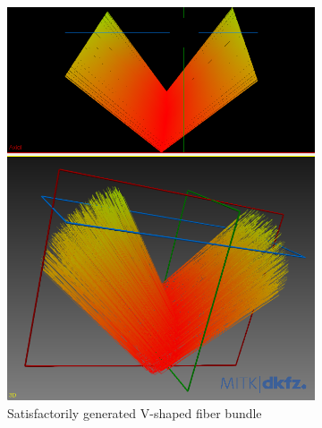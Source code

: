 \documentclass{article}
\begin{document}
  \begin{figure}[!h]
    \begin{subfigure}[b]{0.4\textwidth}
      \includegraphics[width=\textwidth]{sim_gen__v_shape__good}
      \caption{Satisfactorily generated V-shaped fiber bundle}
      \label{fig:f1-a}
    \end{subfigure}
    \hfill
    \begin{subfigure}[b]{0.4\textwidth}

\end{subfigure}
\end{figure}
\end{document}
